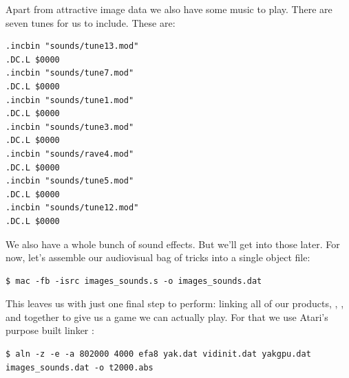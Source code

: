 Apart from attractive image data we also have some music to play. There are seven tunes for us to
include. These are:

\begin{lstlisting}
.incbin "sounds/tune13.mod"
.DC.L $0000
.incbin "sounds/tune7.mod"
.DC.L $0000
.incbin "sounds/tune1.mod"
.DC.L $0000
.incbin "sounds/tune3.mod"
.DC.L $0000
.incbin "sounds/rave4.mod"
.DC.L $0000
.incbin "sounds/tune5.mod"
.DC.L $0000
.incbin "sounds/tune12.mod"
.DC.L $0000
\end{lstlisting}

We also have a whole bunch of sound effects. But we'll get into those later. For now, let's assemble
our audiovisual bag of tricks into a single object file:
\begin{lstlisting}
$ mac -fb -isrc images_sounds.s -o images_sounds.dat
\end{lstlisting}

This leaves us with just one final step to perform: linking all of our products, , ,
and  together to give us a game we can actually play. For that we use Atari's purpose built 
linker :

\begin{lstlisting}
$ aln -z -e -a 802000 4000 efa8 yak.dat vidinit.dat yakgpu.dat images_sounds.dat -o t2000.abs
\end{lstlisting}


